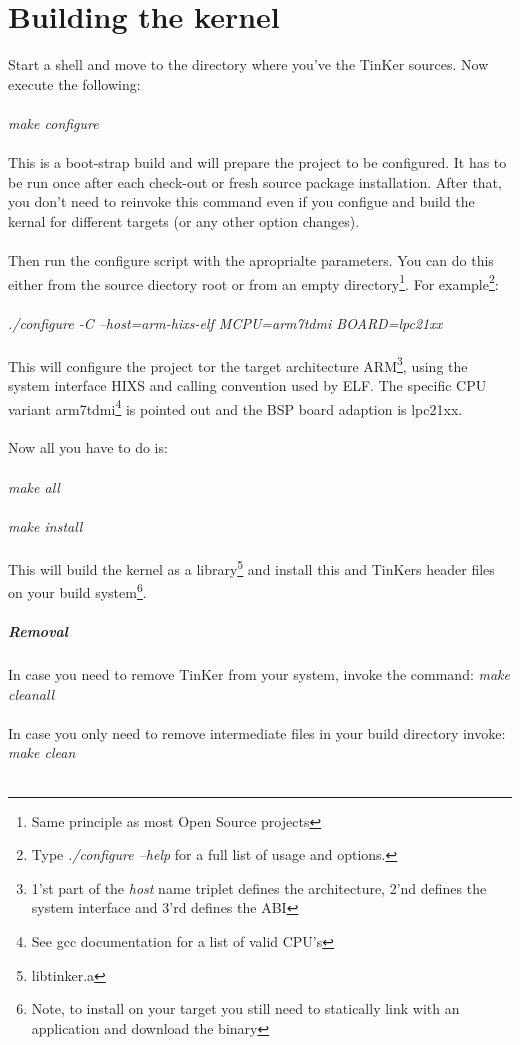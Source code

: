 \chapter{Building the kernel}
Start a shell and move to the directory where you've the TinKer sources. Now execute the following:
\\\\
\textit{make configure}
\\\\
This is a boot-strap build and will prepare the project to be configured. It has to be run once after each check-out or fresh source package installation. After that, you don't need to reinvoke this command even if you configue and build the kernal for different targets (or any other option changes).
\\\\
Then run the configure script with the aproprialte parameters. You can do this either from the source diectory root or from an empty directory\footnote{Same principle as most Open Source projects}. For example\footnote{Type  \textit{./configure --help} for a full list of usage and options.}:
\\\\
\textit{./configure -C --host=arm-hixs-elf MCPU=arm7tdmi BOARD=lpc21xx}
\\\\
This will configure the project tor the target architecture ARM\footnote{1'st part of the \textit{host} name triplet defines the architecture, 2'nd defines the system interface and 3'rd defines the ABI}, using the system interface HIXS and calling convention used by ELF. The specific CPU variant arm7tdmi\footnote{See gcc documentation for a list of valid CPU's} is pointed out and the BSP board adaption is lpc21xx.
\\\\
Now all you have to do is:
\\\\
\textit{make all}
\\\\
\textit{make install}
\\\\
This will build the kernel as a library\footnote{libtinker.a} and install this and TinKers header files on your build system\footnote{Note, to install on your target you still need to statically link with an application and download the binary}.

\paragraph{Removal}
In case you need to remove TinKer from your system, invoke the command: \textit{make cleanall}\\\\
In case you only need to remove intermediate files in your build directory invoke: \textit{make clean}\\\\

